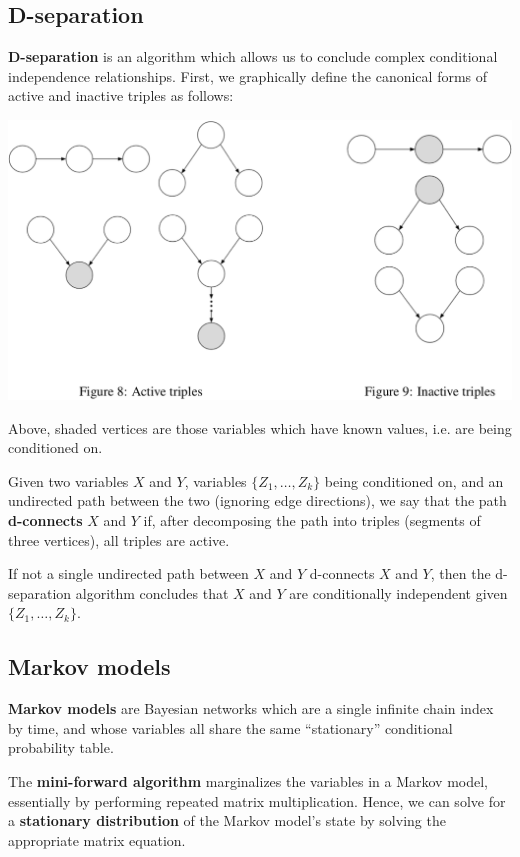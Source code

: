 \documentclass[12pt]{article}
\begin{document}
\subsection{D-separation}

\textbf{D-separation} is an algorithm which allows us to conclude complex conditional independence relationships. First, we graphically define the canonical forms of active and inactive triples as follows:
\begin{center}
\includegraphics[width=.8\textwidth]{images/triple_graphs}
\end{center}
Above, shaded vertices are those variables which have known values, i.e. are being conditioned on.

Given two variables $X$ and $Y$, variables $\{Z_1, \ldots, Z_k\}$ being conditioned on, and an undirected path between the two (ignoring edge directions), we say that the path \textbf{d-connects} $X$ and $Y$ if, after decomposing the path into triples (segments of three vertices), all triples are active.

If not a single undirected path between $X$ and $Y$ d-connects $X$ and $Y$, then the d-separation algorithm concludes that $X$ and $Y$ are conditionally independent given $\{Z_1, \ldots, Z_k\}$.

\subsection{Markov models}

\textbf{Markov models} are Bayesian networks which are a single infinite chain index by time, and whose variables all share the same ``stationary'' conditional probability table.

The \textbf{mini-forward algorithm} marginalizes the variables in a Markov model, essentially by performing repeated matrix multiplication. Hence, we can solve for a \textbf{stationary distribution} of the Markov model's state by solving the appropriate matrix equation.
\end{document}
